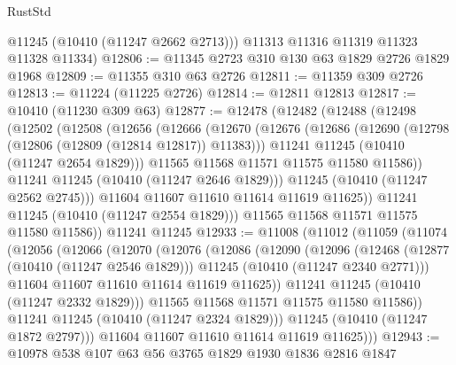 \begin{lexlean}{RustStd}
\begin{coremodule}
        @11245
        (@10410 (@11247 @2662 @2713)))
      @11313
      @11316
      @11319
      @11323
      @11328
      @11334)
@12806 := @11345 @2723 @310 @130 @63 @1829 @2726 @1829 @1968
@12809 := @11355 @310 @63 @2726
@12811 := @11359 @309 @2726
@12813 := @11224 (@11225 @2726)
@12814 := @12811 @12813
@12817 := @10410 (@11230 @309 @63)
@12877 := @12478
    (@12482
      (@12488
        (@12498
          (@12502
            (@12508
              (@12656
                (@12666
                  (@12670
                    (@12676
                      (@12686
                        (@12690 (@12798 (@12806 (@12809 (@12814 @12817)) @11383)))
                        @11241
                        @11245
                        (@10410 (@11247 @2654 @1829)))
                      @11565
                      @11568
                      @11571
                      @11575
                      @11580
                      @11586))
                  @11241
                  @11245
                  (@10410 (@11247 @2646 @1829)))
                @11245
                (@10410 (@11247 @2562 @2745)))
              @11604
              @11607
              @11610
              @11614
              @11619
              @11625))
          @11241
          @11245
          (@10410 (@11247 @2554 @1829)))
        @11565
        @11568
        @11571
        @11575
        @11580
        @11586))
    @11241
    @11245
@12933 := @11008
    (@11012
      (@11059
        (@11074
          (@12056
            (@12066
              (@12070
                (@12076
                  (@12086
                    (@12090
                      (@12096
                        (@12468
                          (@12877 (@10410 (@11247 @2546 @1829)))
                          @11245
                          (@10410 (@11247 @2340 @2771)))
                        @11604
                        @11607
                        @11610
                        @11614
                        @11619
                        @11625))
                    @11241
                    @11245
                    (@10410 (@11247 @2332 @1829)))
                  @11565
                  @11568
                  @11571
                  @11575
                  @11580
                  @11586))
              @11241
              @11245
              (@10410 (@11247 @2324 @1829)))
            @11245
            (@10410 (@11247 @1872 @2797)))
          @11604
          @11607
          @11610
          @11614
          @11619
          @11625)))
@12943 := @10978 @538 @107 @63 @56 @3765 @1829 @1930 @1836 @2816 @1847

\end{coremodule}
\end{lexlean}
